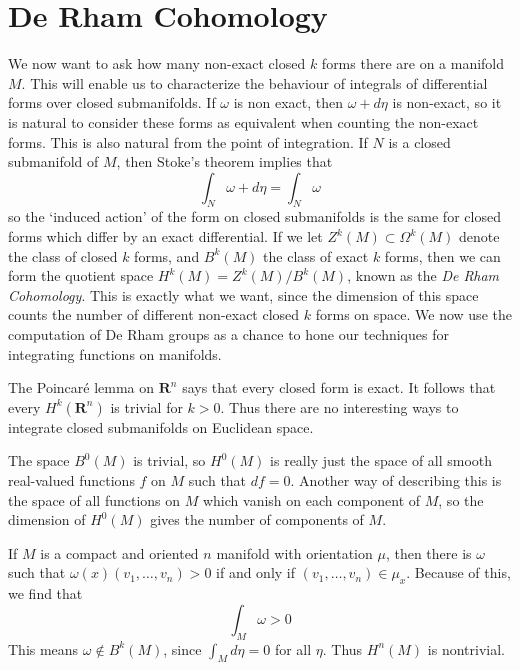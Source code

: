 \chapter{De Rham Cohomology}

We now want to ask how many non-exact closed $k$ forms there are on a manifold $M$. This will enable us to characterize the behaviour of integrals of differential forms over closed submanifolds. If $\omega$ is non exact, then $\omega + d \eta$ is non-exact, so it is natural to consider these forms as equivalent when counting the non-exact forms. This is also natural from the point of integration. If $N$ is a closed submanifold of $M$, then Stoke's theorem implies that
%
\[ \int_N \omega + d \eta = \int_N \omega \]
%
so the `induced action' of the form on closed submanifolds is the same for closed forms which differ by an exact differential. If we let $Z^k(M) \subset \Omega^k(M)$ denote the class of closed $k$ forms, and $B^k(M)$ the class of exact $k$ forms, then we can form the quotient space $H^k(M) = Z^k(M)/B^k(M)$, known as the \emph{De Rham Cohomology}. This is exactly what we want, since the dimension of this space counts the number of different non-exact closed $k$ forms on space. We now use the computation of De Rham groups as a chance to hone our techniques for integrating functions on manifolds.

\begin{example}
    The Poincar\'{e} lemma on $\mathbf{R}^n$ says that every closed form is exact. It follows that every $H^k(\mathbf{R}^n)$ is trivial for $k > 0$. Thus there are no interesting ways to integrate closed submanifolds on Euclidean space.
\end{example}

\begin{example}
    The space $B^0(M)$ is trivial, so $H^0(M)$ is really just the space of all smooth real-valued functions $f$ on $M$ such that $df = 0$. Another way of describing this is the space of all functions on $M$ which vanish on each component of $M$, so the dimension of $H^0(M)$ gives the number of components of $M$.
\end{example}

\begin{example}
    If $M$ is a compact and oriented $n$ manifold with orientation $\mu$, then there is $\omega$ such that $\omega(x)(v_1, \dots, v_n) > 0$ if and only if $(v_1, \dots, v_n) \in \mu_x$. Because of this, we find that
    \[ \int_M \omega > 0 \]
    This means $\omega \not \in B^k(M)$, since $\int_M d \eta = 0$ for all $\eta$. Thus $H^n(M)$ is nontrivial.
\end{example}

